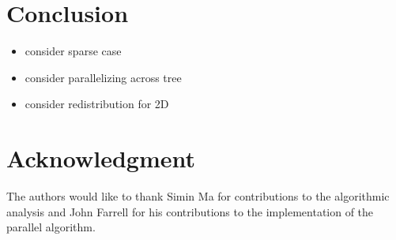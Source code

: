 \documentclass[conference,compsoc]{IEEEtran}
\begin{document}
\section{Conclusion}

\begin{itemize}
	\item consider sparse case
	\item consider parallelizing across tree
	\item consider redistribution for 2D
\end{itemize}

\section*{Acknowledgment}

The authors would like to thank Simin Ma for contributions to the algorithmic analysis and John Farrell for his contributions to the implementation of the parallel algorithm.



\end{document}

